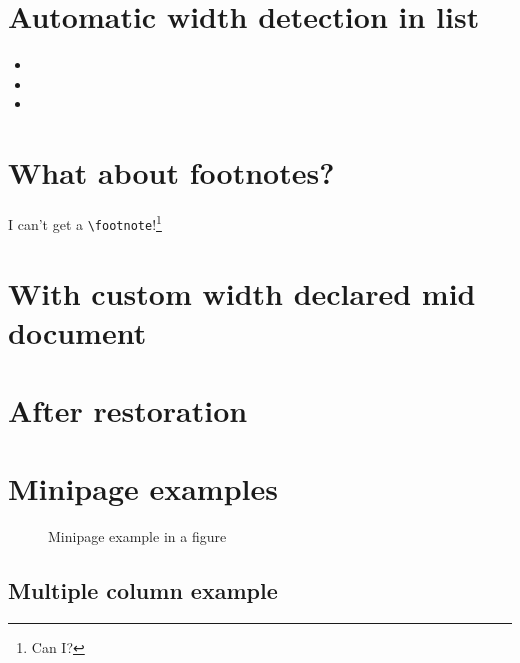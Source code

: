 \documentclass{article}
\begin{document}
\section{Automatic width detection in list}

\lipsum[1][1-3]
\notebox{\lipsum[1][4-6]}
\lipsum[1][7-9]

\begin{itemize}
\item \lipsum[2][1-3]
\item \lipsum[2][4-5]\notebox{\lipsum[2][6-7]}
\item \lipsum[2][8-9]
\end{itemize}

\lipsum[3][1-3]
\notebox{\lipsum[3][4-6]}
\lipsum[3][7-9]

\section{What about footnotes?}

\begin{noteblock}
I can't get a \verb|\footnote|!\footnote{Can I?}
\end{noteblock}

\section{With custom width declared mid document}

\setlength{\aweboxcontentwidth}{0.45\linewidth}

\lipsum[4][1-3]
\notebox{\lipsum[4][4-6]}
\lipsum[4][7-9]

\section{After restoration}

\setlength{\aweboxcontentwidth}{0.88\linewidth}

\lipsum[5][1-3]
\notebox{\lipsum[5][4-6]}
\lipsum[5][7-9]

\section{Minipage examples}


\begin{figure}[h!]
  \centering
  \caption{Minipage example in a figure}
  \label{fig:minipageex}
\end{figure}

\clearpage

\begin{multicols}{2}
  \section{Multiple column example}
  \lipsum[1]

  \notebox{\lipsum[2][1-3]}

  \lipsum[3-7]
\end{multicols}
\end{document}

